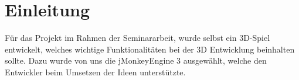 \chapter{Einleitung}\label{ch:einleitung}
Für das Projekt im Rahmen der Seminararbeit, wurde selbst ein 3D-Spiel entwickelt, welches wichtige Funktionalitäten bei der 3D Entwicklung beinhalten sollte. Dazu wurde von uns die jMonkeyEngine 3 ausgewählt, welche den Entwickler beim Umsetzen der Ideen unterstützte.

